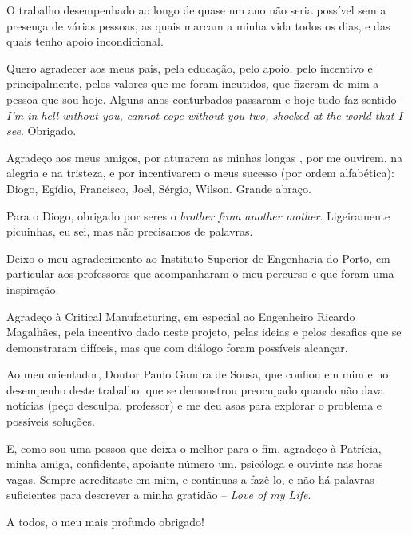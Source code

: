 \begin{acknowledgements}

O trabalho desempenhado ao longo de quase um ano não seria possível sem a presença de várias pessoas, as quais marcam a minha vida todos os dias, e das quais tenho apoio incondicional.

Quero agradecer aos meus pais, pela educação, pelo apoio, pelo incentivo e principalmente, pelos valores que me foram incutidos, que fizeram de mim a pessoa que sou hoje. Alguns anos conturbados passaram e hoje tudo faz sentido -- \textit{I'm in hell without you, cannot cope without you two, shocked at the world that I see}. Obrigado.

Agradeço aos meus amigos, por aturarem as minhas longas , por me ouvirem, na alegria e na tristeza, e por incentivarem o meus sucesso (por ordem alfabética): Diogo, Egídio, Francisco, Joel, Sérgio, Wilson. Grande abraço.

Para o Diogo, obrigado por seres o \textit{brother from another mother}. Ligeiramente picuinhas, eu sei, mas não precisamos de palavras.

Deixo o meu agradecimento ao Instituto Superior de Engenharia do Porto, em particular aos professores que acompanharam o meu percurso e que foram uma inspiração. 

Agradeço à Critical Manufacturing, em especial ao Engenheiro Ricardo Magalhães, pela incentivo dado neste projeto, pelas ideias e pelos desafios que se demonstraram difíceis, mas que com diálogo foram possíveis alcançar.

Ao meu orientador, Doutor Paulo Gandra de Sousa, que confiou em mim e no desempenho deste trabalho, que se demonstrou preocupado quando não dava notícias (peço desculpa, professor) e me deu asas para explorar o problema e possíveis soluções.

E, como sou uma pessoa que deixa o melhor para o fim, agradeço à Patrícia, minha amiga, confidente, apoiante número um, psicóloga e ouvinte nas horas vagas. Sempre acreditaste em mim, e continuas a fazê-lo, e não há palavras suficientes para descrever a minha gratidão -- \textit{Love of my Life}.

A todos, o meu mais profundo obrigado!
\end{acknowledgements}
